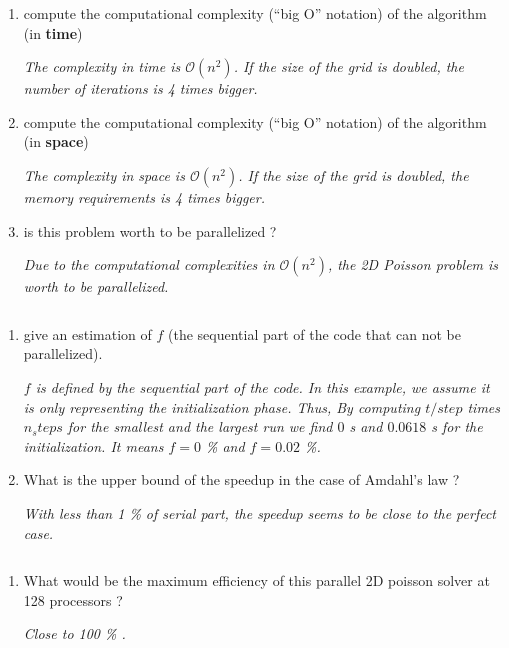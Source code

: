 \documentclass[11pt,a4paper]{article}
\begin{document}
\begin{exercise}
  $~$ %
\begin{enumerate}[label=(\alph*)]

	\item compute the computational complexity (``big O'' notation) of the algorithm (in {\bf time})

{\it
	The complexity in time is $\mathcal{O}(n^2)$. If the size of the grid is doubled, the number of iterations is 4 times bigger. 
}

	\item compute the computational complexity (``big O'' notation) of the algorithm (in {\bf space})

{\it
	The complexity in space is $\mathcal{O}(n^2)$. If the size of the grid is doubled, the memory requirements is 4 times bigger. 
}


	\item is this problem worth to be parallelized ?

{\it
	Due to the computational complexities in $\mathcal{O}(n^2)$, the 2D Poisson problem is worth to be parallelized. 
}


\end{enumerate}

\end{exercise}


\begin{exercise}

  $~$ %

\begin{enumerate}[label=(\alph*)]

	\item give an estimation of $f$ (the sequential part of the code that can not be parallelized). 

{\it
	$f$ is defined by the sequential part of the code. In this example, we assume it is only representing the initialization phase. Thus, By computing  $t/step$ times $n_steps$ for the smallest and the largest run we find $0$ s and $0.0618$ s for the initialization. It means $f = 0$ \% and $f = 0.02 $ \%. 
}

	\item What is the upper bound of the speedup in the case of Amdahl's law ? 

{\it
	With less than 1 \% of serial part, the speedup seems to be close to the perfect case. 
}	

\end{enumerate}
  

\end{exercise}



\begin{exercise}

  $~$ %

\begin{enumerate}[label=(\alph*)]
	\item What would be the maximum efficiency of this parallel 2D poisson solver at 128 processors ?

{\it
	Close to 100 \% .
}	


\end{enumerate}
  

\end{exercise}
\end{document}

